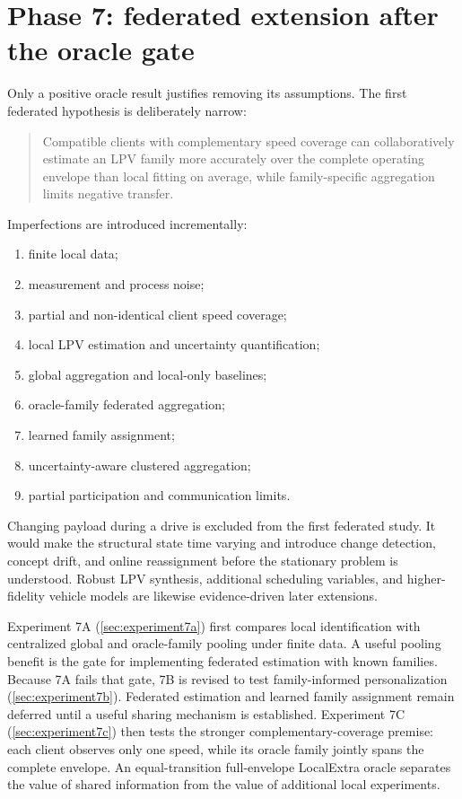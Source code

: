 \section{Phase 7: federated extension after the oracle gate}
\label{sec:phase7}
Only a positive oracle result justifies removing its assumptions. The first
federated hypothesis is deliberately narrow:
\begin{quote}
Compatible clients with complementary speed coverage can collaboratively estimate
an LPV family more accurately over the complete operating envelope than local
fitting on average, while family-specific aggregation limits negative transfer.
\end{quote}
Imperfections are introduced incrementally:
\begin{enumerate}
 \item finite local data;
 \item measurement and process noise;
 \item partial and non-identical client speed coverage;
 \item local LPV estimation and uncertainty quantification;
 \item global aggregation and local-only baselines;
 \item oracle-family federated aggregation;
 \item learned family assignment;
 \item uncertainty-aware clustered aggregation;
 \item partial participation and communication limits.
\end{enumerate}
Changing payload during a drive is excluded from the first federated study. It
would make the structural state time varying and introduce change detection,
concept drift, and online reassignment before the stationary problem is understood.
Robust LPV synthesis, additional scheduling variables, and higher-fidelity vehicle
models are likewise evidence-driven later extensions.

Experiment 7A (\cref{sec:experiment7a}) first compares local identification with
centralized global and oracle-family pooling under finite data. A useful pooling
benefit is the gate for implementing federated estimation with known families.
Because 7A fails that gate, 7B is revised to test family-informed personalization
(\cref{sec:experiment7b}). Federated estimation and learned family assignment
remain deferred until a useful sharing mechanism is established. Experiment 7C
(\cref{sec:experiment7c}) then tests the stronger complementary-coverage premise:
each client observes only one speed, while its oracle family jointly spans the
complete envelope. An equal-transition full-envelope LocalExtra oracle separates
the value of shared information from the value of additional local experiments.
